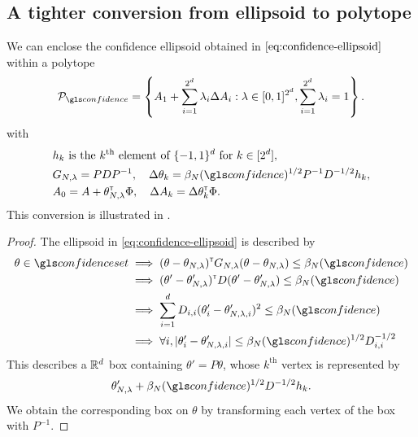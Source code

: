 \begin{subappendices}
	\subsection{A tighter conversion from ellipsoid to polytope}
	\label{sec:tight-polytope}
	
	\begin{lemma}
		\label{lem:tight_polytope}
		\begin{leftbar}[lemmabar]
		We can enclose the confidence ellipsoid obtained in $\eqref{eq:confidence-ellipsoid}$ within a polytope
		\begin{equation}
		\cP_\confidence = \left\{ A_{1}+\sum_{i=1}^{2^d}\lambda_{i}\Delta A_{i}: \lambda\in[0, 1]^{2^d},  \sum_{i=1}^{2^d}\lambda_{i}=1\right\}.
		\end{equation}
		with 
		\begin{align*}
		&h_k \text{ is the }k^\text{th}\text{ element of }\{-1,1\}^d\text{ for } k\in[2^d],\\
		&G_{N,\lambda} = PDP^{-1}, \quad \Delta\theta_k = \beta_{N}(\confidence)^{1/2} P^{-1}D^{-1/2} h_k, \\
		&A_0 = A + \theta_{N,\lambda}^\transp\Phi, \quad \Delta A_k = \Delta\theta_k^\transp\Phi.
		\end{align*}
		This conversion is illustrated in .
		\end{leftbar}
	\end{lemma}

	\begin{proof}
		The ellipsoid in \eqref{eq:confidence-ellipsoid} is described by
		\begin{align*}
		\theta\in\confidenceset &\implies
		(\theta-\theta_{N,\lambda})^\transp G_{N,\lambda}(\theta-\theta_{N,\lambda}) \leq \beta_{N}(\confidence)\\
		&\implies (\theta'-\theta'_{N,\lambda})^\transp D (\theta'-\theta'_{N,\lambda}) \leq \beta_{N}(\confidence)\\
		&\implies \sum_{i=1}^d D_{i,i}(\theta'_i-\theta'_{N,\lambda,i})^2\leq \beta_{N}(\confidence)\\
		&\implies\forall i, |\theta'_i-\theta'_{N,\lambda,i}|\leq \beta_{N}(\confidence)^{1/2}D_{i,i}^{-1/2}
		\end{align*}
		This describes a $\mathbb{R}^d$ box containing $\theta' = P\theta$, whose $k^\text{th}$ vertex is represented by $$\theta_{N,\lambda}' + \beta_{N}(\confidence)^{1/2}D^{-1/2} h_k.$$ We obtain the corresponding box on $\theta$ by transforming each vertex of the box with $P^{-1}$.
	\end{proof}
	

\end{subappendices}
